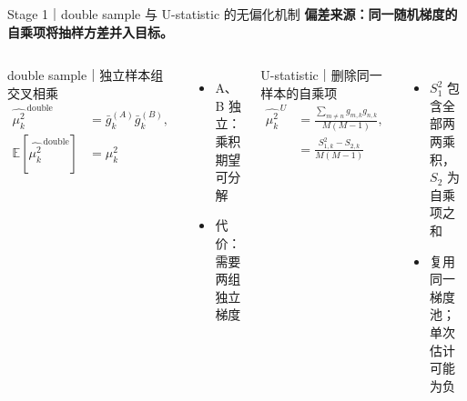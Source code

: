 \documentclass[aspectratio=169,10pt]{beamer}
\begin{document}
\begin{frame}{Stage 1｜double sample 与 U-statistic 的无偏化机制}
  \textbf{偏差来源：同一随机梯度的自乘项将抽样方差并入目标。}
  \vspace{3pt}
  \begin{columns}[T]
      \begin{block}{double sample｜独立样本组交叉相乘}
        \[
          \begin{aligned}
            \widehat{\mu_k^2}^{\,\mathrm{double}}
              &=\bar g_k^{(A)}\bar g_k^{(B)},\\
            \mathbb E[\widehat{\mu_k^2}^{\,\mathrm{double}}]
              &=\mu_k^2
          \end{aligned}
        \]
      \end{block}
      \begin{itemize}
        \item A、B 独立：乘积期望可分解
        \item 代价：需要两组独立梯度
      \end{itemize}
      \begin{block}{U-statistic｜删除同一样本的自乘项}
        \[
          \begin{aligned}
            \widehat{\mu_k^2}^{\,U}
              &=\frac{\sum_{m\ne n}g_{m,k}g_{n,k}}{M(M-1)},\\
              &=\frac{S_{1,k}^2-S_{2,k}}{M(M-1)}
          \end{aligned}
        \]
      \end{block}
      \begin{itemize}
        \item $S_1^2$ 包含全部两两乘积，$S_2$ 为自乘项之和
        \item 复用同一梯度池；单次估计可能为负
      \end{itemize}
  \end{columns}
  \vspace{3pt}
  \centering
\end{frame}
\end{document}
